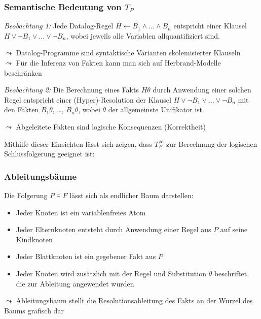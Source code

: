 \documentclass[aspectratio=1610,onlymath]{beamer}
\let\beameroriginaldoublebackslash\\
\let\\=\beameroriginaldoublebackslash
\begin{document}
\begin{frame}\frametitle{Semantische Bedeutung von $T_P$}

\emph{Beobachtung 1:} Jede Datalog-Regel $H\leftarrow B_1\wedge\ldots\wedge B_n$ entspricht einer
Klausel $H\vee\neg B_1\vee\ldots\vee\neg B_n$, wobei jeweils alle Variablen allquantifiziert sind.
\medskip\pause

$\leadsto$ Datalog-Programme sind syntaktische Varianten skolemisierter Klauseln\\
$\leadsto$ Für die Inferenz von Fakten kann man sich auf Herbrand-Modelle beschränken\bigskip\pause

\emph{Beobachtung 2:} Die Berechnung eines Fakts $H\theta$ durch Anwendung einer solchen Regel entspricht einer (Hyper)-Resolution der Klausel $H\vee\neg B_1\vee\ldots\vee\neg B_n$ mit den Fakten $B_1\theta$, \ldots, $B_n\theta$, wobei $\theta$ der allgemeinste Unifikator ist.\medskip\pause

$\leadsto$ Abgeleitete Fakten sind logische Konsequenzen (Korrektheit)\bigskip\pause

Mithilfe dieser Einsichten lässt sich zeigen, dass $T_P^\infty$ zur Berechnung der logischen Schlussfolgerung geeignet ist:


\end{frame}

\begin{frame}\frametitle{Ableitungsbäume}

Die Folgerung $P\models F$ lässt sich als endlicher Baum darstellen:
\begin{itemize}
\item Jeder Knoten ist ein variablenfreies Atom
\item Jeder Elternknoten entsteht durch Anwendung einer Regel aus $P$ auf seine Kindknoten
\item Jeder Blattknoten ist ein gegebener Fakt aus $P$
\item Jeder Knoten wird zusätzlich mit der Regel und Substitution $\theta$ beschriftet, die zur Ableitung angewendet wurden
\end{itemize}
$\leadsto$ Ableitungsbaum stellt die Resolutionsableitung des Fakts an der Wurzel des Baums grafisch dar
\bigskip


\end{frame}
\end{document}
